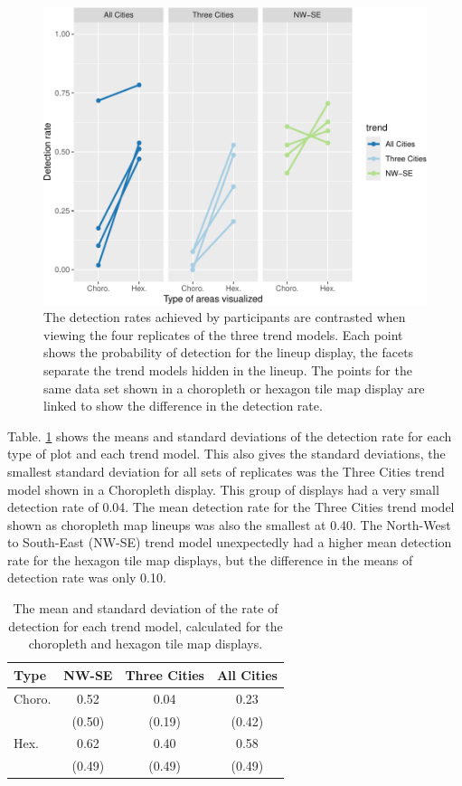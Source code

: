 \documentclass[times, doublespace]{anzsauth}
\begin{document}
\begin{figure}
\includegraphics[width=1\linewidth]{paper_files/figure-latex/detect-compare-1} \caption{The detection rates achieved by participants are contrasted when viewing the four replicates of the three trend models. Each point shows the probability of detection for the lineup display, the facets separate the trend models hidden in the lineup. The points for the same data set shown in a choropleth or hexagon tile map display are linked to show the difference in the detection rate.}\label{fig:detect-compare}
\end{figure}

Table. \ref{tab:desc-stats} shows the means and standard deviations of
the detection rate for each type of plot and each trend model. This also
gives the standard deviations, the smallest standard deviation for all
sets of replicates was the Three Cities trend model shown in a
Choropleth display. This group of displays had a very small detection
rate of 0.04. The mean detection rate for the Three Cities trend model
shown as choropleth map lineups was also the smallest at 0.40. The
North-West to South-East (NW-SE) trend model unexpectedly had a higher
mean detection rate for the hexagon tile map displays, but the
difference in the means of detection rate was only 0.10.

\begin{table}

\caption{\label{tab:desc-stats}The mean and standard deviation of the rate of detection for each trend model, calculated for the choropleth and hexagon tile map displays.}
\centering
\begin{tabular}[t]{lccc}
\toprule
Type & NW-SE & Three Cities & All Cities\\
\midrule
Choro. & 0.52 & 0.04 & 0.23\\
 & (0.50) & (0.19) & (0.42)\\
\addlinespace
Hex. & 0.62 & 0.40 & 0.58\\
 & (0.49) & (0.49) & (0.49)\\
\bottomrule
\end{tabular}
\end{table}
\end{document}
